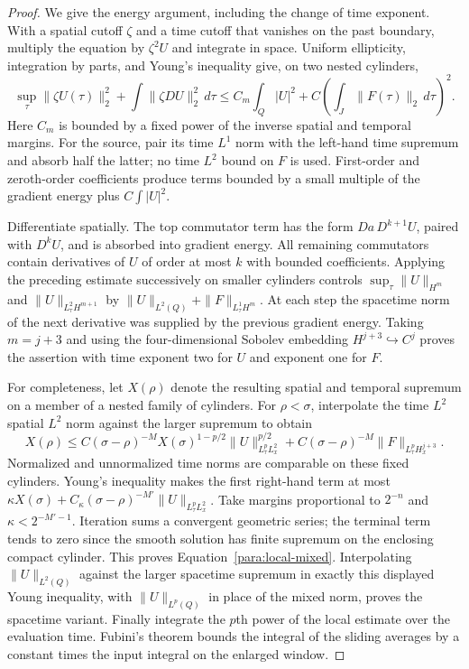 \begin{proof}
We give the energy argument, including the change of time exponent.
With a spatial cutoff $\zeta$ and a time cutoff that vanishes on the
past boundary, multiply the equation by $\zeta^2U$ and integrate in
space.  Uniform ellipticity, integration by parts, and Young's inequality
give, on two nested cylinders,
\[
 \sup_\tau\|\zeta U(\tau)\|_2^2
 +\int\|\zeta DU\|_2^2\,d\tau
 \le C_m\int_Q|U|^2
   +C\left(\int_J\|F(\tau)\|_2\,d\tau\right)^2.
\]
Here $C_m$ is bounded by a fixed power of the inverse spatial and temporal
margins.  For the source, pair its time $L^1$ norm with the left-hand
time supremum and absorb half the latter; no time $L^2$ bound on $F$
is used.  First-order and zeroth-order coefficients produce terms
bounded by a small multiple of the gradient energy plus $C\int|U|^2$.

Differentiate spatially.  The top commutator term has the form
$Da\,D^{k+1}U$, paired with $D^kU$, and is absorbed into gradient
energy.  All remaining commutators contain derivatives of $U$ of order
at most $k$ with bounded coefficients.  Applying the preceding estimate
successively on smaller cylinders controls
$\sup_\tau\|U\|_{H^m}$ and $\|U\|_{L^2_\tau H^{m+1}}$ by
$\|U\|_{L^2(Q)}+\|F\|_{L^1_\tau H^m}$.  At each step the spacetime
norm of the next derivative was supplied by the previous gradient
energy.  Taking $m=j+3$ and using the four-dimensional Sobolev embedding
$H^{j+3}\hookrightarrow C^j$ proves the assertion with time exponent
two for $U$ and exponent one for $F$.

For completeness, let $X(\rho)$ denote the resulting spatial and temporal
supremum on a member of a nested family of cylinders.  For
$\rho<\sigma$, interpolate the time $L^2$ spatial $L^2$ norm against
the larger supremum to obtain
\[
 X(\rho)\le C(\sigma-\rho)^{-M}
   X(\sigma)^{1-p/2}\|U\|_{L^p_\tau L^2_x}^{p/2}
   +C(\sigma-\rho)^{-M}\|F\|_{L^p_\tau H^{j+3}_x}.
\]
Normalized and unnormalized time norms are comparable on these fixed
cylinders.  Young's inequality makes the first right-hand term at most
$\kappa X(\sigma)+C_\kappa(\sigma-\rho)^{-M'}\|U\|_{L^p_\tau L^2_x}$.
Take margins proportional to $2^{-n}$ and $\kappa<2^{-M'-1}$.
Iteration sums a convergent geometric series; the terminal term tends
to zero since the smooth solution has finite supremum on the enclosing
compact cylinder.  This proves Equation~\eqref{para:local-mixed}.
Interpolating $\|U\|_{L^2(Q)}$ against the larger spacetime supremum
in exactly this displayed Young inequality, with $\|U\|_{L^p(Q)}$
in place of the mixed norm, proves the spacetime variant.
Finally integrate the $p$th power of the local estimate over the
evaluation time.  Fubini's theorem bounds the integral of the sliding
averages by a constant times the input integral on the enlarged window.
\end{proof}

